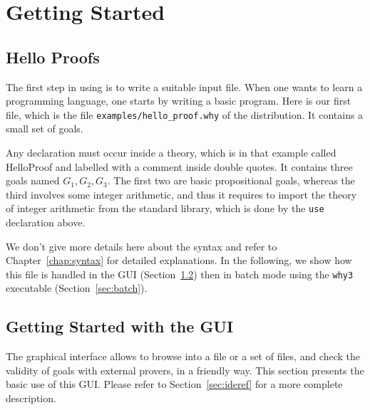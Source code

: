 \chapter{Getting Started}
\label{chap:starting}

\section{Hello Proofs}

The first step in using \why is to write a suitable input
file. When one wants to learn a programming language, one starts by
writing a basic program. Here is our first \why file, which is the file
\texttt{examples/hello\_proof.why} of the distribution. It contains a
small set of goals.


Any declaration must occur
inside a theory, which is in that example called HelloProof and
labelled with a comment inside double quotes. It contains three goals
named $G_1,G_2,G_3$. The first two are basic propositional goals,
whereas the third involves some integer arithmetic, and thus it
requires to import the theory of integer arithmetic from the \why
standard library, which is done by the \texttt{use} declaration above.

We don't give more details here about the syntax and refer to
Chapter~\ref{chap:syntax} for detailed explanations. In the following,
we show how this file is handled in the \why GUI
(Section~\ref{sec:gui}) then in batch mode using the \texttt{why3}
executable (Section~\ref{sec:batch}).


\section{Getting Started with the GUI}
\label{sec:gui}

The graphical interface allows to browse into a file or a set of
files, and check the validity of goals with external provers, in a
friendly way. This section presents the basic use of this GUI. Please
refer to Section~\ref{sec:ideref} for a more complete description.


